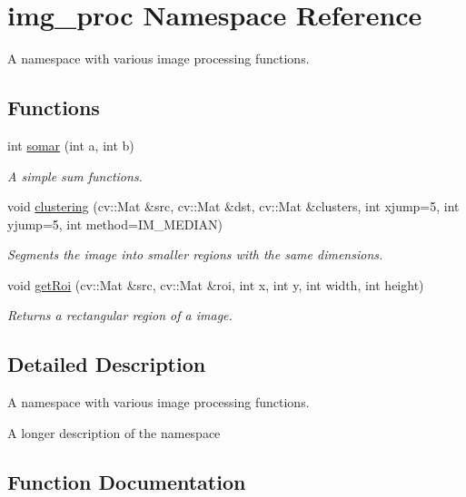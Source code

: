 \hypertarget{namespaceimg__proc}{}\section{img\+\_\+proc Namespace Reference}
\label{namespaceimg__proc}


A namespace with various image processing functions.  


\subsection*{Functions}
\begin{DoxyCompactItemize}
\item 
int \hyperlink{namespaceimg__proc_ade055a73f7f4952c3066968b515b27c6}{somar} (int a, int b)
\begin{DoxyCompactList}\small\item\em A simple sum functions. \end{DoxyCompactList}\item 
void \hyperlink{namespaceimg__proc_a793a09c4f4271e201cf8c679070d8cea}{clustering} (cv\+::\+Mat \&src, cv\+::\+Mat \&dst, cv\+::\+Mat \&clusters, int xjump=5, int yjump=5, int method=I\+M\+\_\+\+M\+E\+D\+I\+AN)
\begin{DoxyCompactList}\small\item\em Segments the image into smaller regions with the same dimensions. \end{DoxyCompactList}\item 
void \hyperlink{namespaceimg__proc_a394a29fff96e5429e78313599a26a6c3}{get\+Roi} (cv\+::\+Mat \&src, cv\+::\+Mat \&roi, int x, int y, int width, int height)
\begin{DoxyCompactList}\small\item\em Returns a rectangular region of a image. \end{DoxyCompactList}\end{DoxyCompactItemize}


\subsection{Detailed Description}
A namespace with various image processing functions. 

A longer description of the namespace 

\subsection{Function Documentation}
\mbox{\label{namespaceimg__proc_a793a09c4f4271e201cf8c679070d8cea}} 
